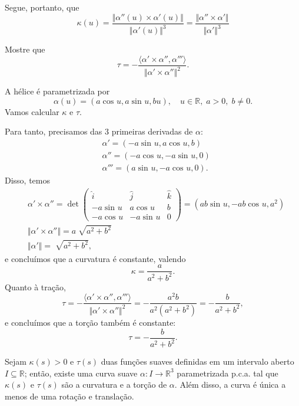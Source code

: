 \documentclass[../differential_geometry.tex]{subfiles}
\begin{document}
Segue, portanto, que
\[
	\kappa (u)=\frac{\Vert \alpha ''(u)\times \alpha '(u) \Vert}{\Vert \alpha '(u) \Vert^{3}} = \frac{\Vert \alpha ''\times \alpha '\Vert}{\Vert \alpha '\Vert^{3}}
\]
\begin{exr}
	Mostre que
	\[
		\tau = - \frac{\langle \alpha ' \times \alpha '', \alpha ''' \rangle}{\Vert \alpha '\times \alpha '' \Vert^{2}}.
	\]
\end{exr}
\begin{example}
	A hélice é parametrizada por
	\[
		\alpha (u)=(a\cos^{}{u}, a \sin^{}{u}, bu),\quad u\in \mathbb{R},\; a>0,\; b\neq 0.
	\]
	Vamos calcular \(\kappa \) e \(\tau \).

	Para tanto, precisamos das 3 primeiras derivadas de \(\alpha \):
	\begin{align*}
		 & \alpha '=(-a \sin^{}{u}, a \cos^{}{u}, b)       \\
		 & \alpha '' = (-a \cos^{}{u}, -a \sin^{}{u}, 0)   \\
		 & \alpha ''' = (a \sin^{}{u}, - a \cos^{}{u}, 0).
	\end{align*}
	Disso, temos
	\begin{align*}
		 & \alpha ' \times \alpha '' = \det\begin{pmatrix}
			                                   \hat{i}       & \hat{j}       & \hat{k} \\
			                                   -a \sin^{}{u} & a \cos^{}{u}  & b       \\
			                                   -a \cos^{}{u} & -a \sin^{}{u} & 0
		                                   \end{pmatrix} = (ab \sin^{}{u}, -ab \cos^{}{u}, a^{2}) \\
		 & \Vert \alpha ' \times  \alpha '' \Vert = a \sqrt[]{a^{2}+b^{2}}                        \\
		 & \Vert \alpha ' \Vert = \sqrt[]{a^{2}+b^{2}},
	\end{align*}
	e concluímos que a curvatura é constante, valendo
	\[
		\kappa = \frac{a}{a^{2}+b^{2}}.
	\]
	Quanto à tração,
	\[
		\tau = - \frac{\langle \alpha ' \times \alpha '', \alpha '''  \rangle}{\Vert \alpha ' \times \alpha '' \Vert^{2}}=-\frac{a^{2}b}{a^{2}(a^{2}+b^{2})}=-\frac{b}{a^{2}+b^{2}},
	\]
	e concluímos que a torção também é constante:
	\[
		\tau = - \frac{b}{a^{2}+b^{2}}.
	\]
\end{example}

\begin{theorem*}
	Sejam \(\kappa (s)>0\) e \(\tau (s)\) duas funções suaves definidas em um intervalo aberto \(I\subseteq \mathbb{R}\); então, existe uma curva suave \(\alpha :I\rightarrow \mathbb{R}^{3}\) parametrizada p.c.a. tal que \(\kappa (s)\) e \(\tau (s)\) são a curvatura e a torção de \(\alpha.\) Além disso, a curva é única a menos de uma rotação e translação.
\end{theorem*}
\end{document}
